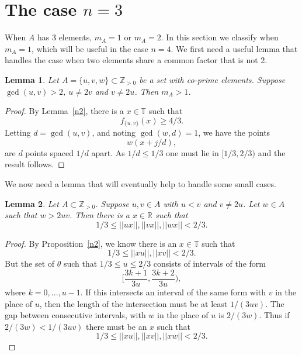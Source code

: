\documentclass[12pt,reqno]{amsart}
\theoremstyle{dotless}
\newtheorem{lemma}{Lemma}
\begin{document}
\section{The case $n=3$}\label{sec5}
When $A$ has 3 elements, $m_A = 1$ or $m_A = 2$. In this section we classify when $m_A =1$, which will be useful in the case $n=4$. We first need a useful lemma that handles the case when two elements share a common factor that is not 2.

\begin{lemma}\label{gcd3}
Let $A = \{u,v,w\} \subset \mathbb{Z}_{> 0}$ be a set with co-prime elements. Suppose $\gcd(u,v) > 2$, $u \neq 2v$ and $v \neq 2u$. Then $m_A > 1$. 
\end{lemma}
\begin{proof}
By Lemma~\ref{n2}, there is a $x \in \mathbb{T}$ such that 
$$f_{\{u,v\}}(x) \geq 4/3.$$
Letting $d = \gcd(u,v)$, and noting $\gcd(w,d) = 1$, we have the points 
$$w(x + j/d),$$
are $d$ points spaced $1/d$ apart. As $1/d \leq 1/3$ one must lie in $[1/3,2/3)$ and the result follows.

\end{proof}

We now need a lemma that will eventually help to handle some small cases. 
 \begin{lemma}\label{size4} 
Let $A \subset \mathbb{Z}_{> 0}$. Suppose $u,v \in A$ with $u < v$ and $v \neq 2u$. Let $w \in A$ such that $w > 2uv$. Then there is a $x \in \mathbb{R}$ such that 
$$1/3 \leq || ux || , || vx|| , ||wx|| < 2/3.$$  
\end{lemma}

\begin{proof}
By Proposition~\ref{n2}, we know there is an $x\in \mathbb{T}$ such that 
$$1/3 \leq ||xu|| , ||xv|| < 2/3.$$
But the set of $\theta$ such that $1/3 \leq u \leq 2/3$ consists of intervals of the form
$$[\frac{3k+1}{3u} , \frac{3k+2}{3u} ),$$
where $k = 0 , \ldots , u-1$. If this intersects an interval of the same form with $v$ in the place of $u$, then the length of the intersection must be at least $1/(3uv)$. The gap between consecutive intervals, with $w$ in the place of $u$ is $2/(3w)$. Thus if $2/(3w) < 1/(3uv)$ there must be an $x$ such that 
$$1/3 \leq ||xu|| , ||xv||, ||xw|| < 2/3.$$

\end{proof}
\end{document}
